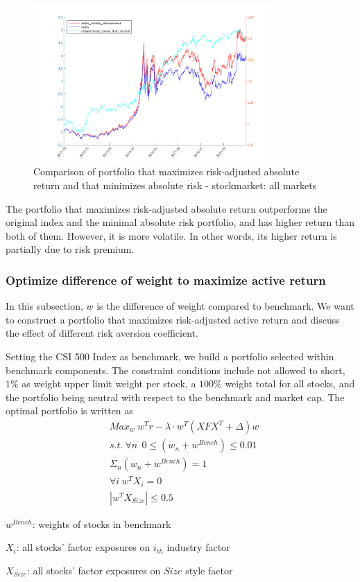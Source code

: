 \documentclass[10pt]{article}
\begin{document}
\begin{figure}[H]
    \centering
     \includegraphics[width=0.8\textwidth,height=0.4\textwidth]{outside_enhancement_than_neutral.png}
    \caption{Comparison of portfolio that maximizes risk-adjusted absolute return and that minimizes absolute risk - stockmarket: all markets}
    \label{fig:Fig13}
\end{figure}

The portfolio that maximizes risk-adjusted absolute return outperforms the original index and the minimal absolute risk portfolio, and has higher return than both of them. However, it is more volatile. In other words, its higher return is partially due to risk premium.

\subsubsection{Optimize difference of weight to maximize active return}
In this subsection, $w$ is the difference of weight compared to benchmark. We want to construct a portfolio that maximizes risk-adjusted active return and discuss the effect of different risk aversion coefficient.


Setting the CSI 500 Index as benchmark, we build a portfolio selected within benchmark components. The constraint conditions include not allowed to short, $1\%$ as weight upper limit weight per stock, a $100\%$ weight total for all stocks, and the portfolio being neutral with respect to the benchmark and market cap. The optimal portfolio is written as 
~\\
\begin{equation}
\begin{split}
    &Max_w\ w^Tr-\lambda\cdot w^T(XFX^T+\Delta)w\\
    &s.t.\ \forall n\ \ 0\leq (w_n+w^{Bench})\leq0.01\\
    &\Sigma_n(w_n+w^{Bench})=1\\
    &\forall i\ w^TX_i=0 \\
    &|w^TX_{Size}|\leq0.5
\end{split}
\end{equation}
\centerline{$w^{Bench}$: weights of stocks in benchmark}
\centerline{$X_i$: all stocks' factor exposures on $i_{th}$ industry factor}
\centerline{$X_{Size}$: all stocks' factor exposures on $Size$ style factor}
~\\
\end{document}
